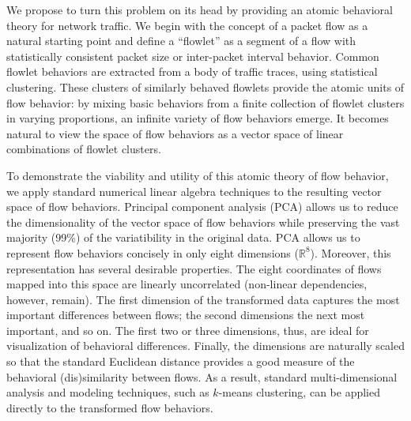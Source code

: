 \documentclass[conference]{IEEEtran}
\newcommand{\caps}[1]{{\small{#1}}}
\newcommand{\R}{\mathbb{R}}
\begin{document}

We propose to turn this problem on its head by providing an atomic behavioral theory for network traffic. We begin with the concept of a packet flow as a natural starting point and define a ``{flowlet}'' as a segment of a flow with statistically consistent packet size or inter-packet interval behavior. %
Common flowlet behaviors are extracted from a body of traffic traces, using statistical clustering. These clusters of similarly behaved flowlets provide the atomic units of flow behavior: by mixing basic behaviors from a finite collection of flowlet clusters in varying proportions, an infinite variety of flow behaviors emerge. It becomes natural to view the space of flow behaviors as a vector space of linear combinations of flowlet clusters.

To demonstrate the viability and utility of this atomic theory of flow behavior, we apply standard numerical linear algebra techniques to the resulting vector space of flow behaviors. Principal component analysis (\caps{PCA}) allows us to reduce the dimensionality of the vector space of flow behaviors while preserving the vast majority (99\%) of the variatibility in the original data. \caps{PCA} allows us to represent flow behaviors concisely in only eight dimensions ($\R^8$). Moreover, this representation has several desirable properties. The eight coordinates of flows mapped into this space are linearly uncorrelated (non-linear dependencies, however, remain). The first dimension of the transformed data captures the most important differences between flows; the second dimensions the next most important, and so on. The first two or three dimensions, thus, are ideal for visualization of behavioral differences. Finally, the dimensions are naturally scaled so that the standard Euclidean distance provides a good measure of the behavioral (dis)similarity between flows. As a result, standard multi-dimensional analysis and modeling techniques, such as $k$-means clustering, can be applied directly to the transformed flow behaviors.
\end{document}
